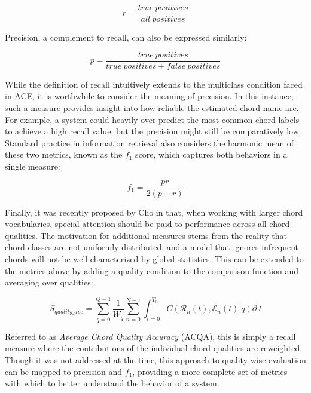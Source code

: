 \begin{equation}
r = \frac{true~positives}{all~positives}
\end{equation}

Precision, a complement to recall, can also be expressed similarly:

\begin{equation}
p = \frac{true~positives}{true~positives + false~positives}
\end{equation}

\noindent While the definition of recall intuitively extends to the multiclass condition faced in ACE, it is worthwhile to consider the meaning of precision.
In this instance, such a measure provides insight into how reliable the estimated chord name are.
For example, a system could heavily over-predict the most common chord labels to achieve a high recall value, but the precision might still be comparatively low.
Standard practice in information retrieval also considers the harmonic mean of these two metrics, known as the $f_1$ score, which captures both behaviors in a single measure:

\begin{equation}
f_1 = \frac{pr}{2(p+r)}
\end{equation}

Finally, it was recently proposed by Cho in \cite{Cho2014PhD} that, when working with larger chord vocabularies, special attention should be paid to performance across all chord qualities.
The motivation for additional measures stems from the reality that chord classes are not uniformly distributed, and a model that ignores infrequent chords will not be well characterized by global statistics.
This can be extended to the metrics above by adding a quality condition to the comparison function and averaging over qualities:

\begin{equation}
S_{quality\_ave} = \sum_{q=0}^{Q-1}\frac{1}{W_q}\sum_{n=0}^{N-1}\int_{t=0}^{T_n}C(\mathcal{R}_n(t), \mathcal{E}_n(t) | q)\partial~t
\end{equation}

\noindent Referred to as \emph{Average Chord Quality Accuracy} (ACQA), this is simply a recall measure where the contributions of the individual chord qualities are reweighted.
Though it was not addressed at the time, this approach to quality-wise evaluation can be mapped to precision and $f_{1}$, providing a more complete set of metrics with which to better understand the behavior of a system.


